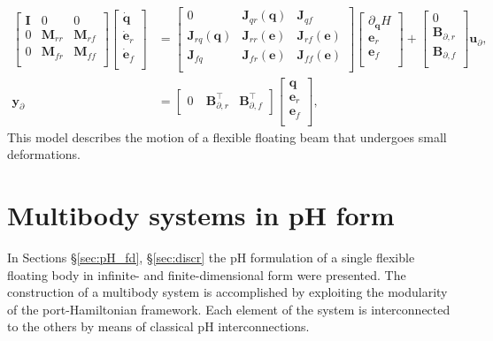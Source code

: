 \documentclass{svjour3}                     %
\newcommand{\secref}[1]{\S\ref{#1}}
\begin{document}
\begin{equation}
\label{eq:EB_sys}
\begin{aligned}
\begin{bmatrix}
\bm{I} & 0 & 0 \\
0 & \bm{M}_{rr} & \bm{M}_{rf}\\ 
0 & \bm{M}_{fr} & \bm{M}_{ff}\\
\end{bmatrix} 
\begin{bmatrix}
\dot{\bm{q}} \\ 
\dot{\bm{e}}_{r} \\ 
\dot{\bm{e}}_{f} \\ 
\end{bmatrix} &= 
\begin{bmatrix}
0 & \bm{J}_{qr}(\bm{q}) & \bm{J}_{qf} \\
\bm{J}_{rq}(\bm{q}) & \bm{J}_{rr}(\bm{e}) & \bm{J}_{rf}(\bm{e})\\ 
\bm{J}_{fq} & \bm{J}_{fr}(\bm{e}) & \bm{J}_{ff}(\bm{e})\\
\end{bmatrix}  
\begin{bmatrix}
\partial_{\bm{q}} H \\
{\bm{e}}_{r} \\ 
{\bm{e}}_{f} \\ 
\end{bmatrix} + 
\begin{bmatrix}
0 \\
\bm{B}_{\partial, r} \\ 
\bm{B}_{\partial, f} \\ 
\end{bmatrix}
 \bm{u}_\partial, \\
\bm{y}_\partial &= \begin{bmatrix}
0 \ & \bm{B}_{\partial, r}^\top & \bm{B}_{\partial, f}^\top  
\end{bmatrix} \begin{bmatrix}
\bm{q} \\
{\bm{e}}_{r} \\ 
{\bm{e}}_{f} \\ 
\end{bmatrix},
\end{aligned}
\end{equation}
This model describes the motion of a flexible floating beam that undergoes small deformations. 

\section{Multibody systems in pH form}
\label{sec:MB_pH}
In Sections \secref{sec:pH_fd}, \secref{sec:discr} the pH formulation of a single flexible floating body in infinite- and finite-dimensional form were presented. The construction of a multibody system is accomplished by exploiting the modularity of the port-Hamiltonian framework. Each element of the system is interconnected to the others by means of classical pH interconnections.
\end{document}
